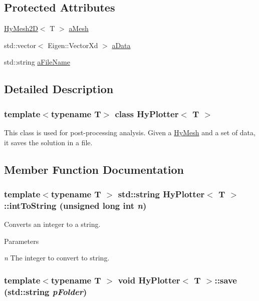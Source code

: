 \subsection*{Protected Attributes}
\begin{DoxyCompactItemize}
\item 
\hyperlink{classHyMesh2D}{HyMesh2D}$<$ T $>$ \hyperlink{classHyPlotter_add8bc0e65fe86f1e8efb025afd679f70}{aMesh}
\item 
std::vector$<$ Eigen::VectorXd $>$ \hyperlink{classHyPlotter_a9aa282a34786a8d215a28b43816a2e6c}{aData}
\item 
std::string \hyperlink{classHyPlotter_a7ff236b2b02b1ee33554d0c2d483ca83}{aFileName}
\end{DoxyCompactItemize}


\subsection{Detailed Description}
\subsubsection*{template$<$typename T$>$ class HyPlotter$<$ T $>$}

This class is used for post-\/processing analysis. Given a \hyperlink{classHyMesh}{HyMesh} and a set of data, it saves the solution in a file. 

\subsection{Member Function Documentation}
\hypertarget{classHyPlotter_a3901644f0e38b620ebe2c02b2198aa23}{
\subsubsection[{intToString}]{\setlength{\rightskip}{0pt plus 5cm}template$<$typename T $>$ std::string {\bf HyPlotter}$<$ T $>$::intToString (unsigned long int {\em n})}}
\label{classHyPlotter_a3901644f0e38b620ebe2c02b2198aa23}


Converts an integer to a string. 


\begin{DoxyParams}{Parameters}
\item[{\em n}]The integer to convert to string. \end{DoxyParams}
\hypertarget{classHyPlotter_acb107c1c3cf44bb32b900c329830fdfd}{
\subsubsection[{save}]{\setlength{\rightskip}{0pt plus 5cm}template$<$typename T $>$ void {\bf HyPlotter}$<$ T $>$::save (std::string {\em pFolder})}}
\label{classHyPlotter_acb107c1c3cf44bb32b900c329830fdfd}


